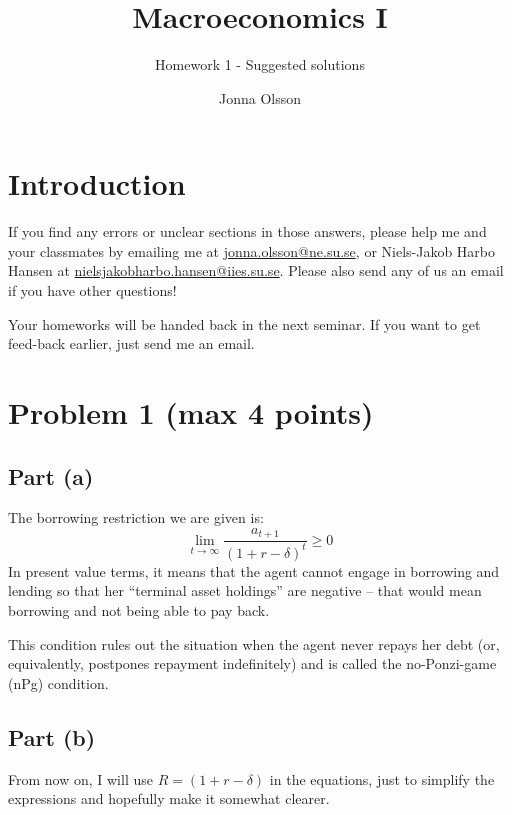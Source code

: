 \documentclass{scrartcl}
\begin{document}
\pagestyle{fancy}
\fancyhead{}
\fancyhead[LE,RO]{\thepage}
\fancyfoot{}

\title{Macroeconomics I}
\subtitle{Homework 1 - Suggested solutions}
\author{Jonna Olsson}
\maketitle

\section*{Introduction}
If you find any errors or unclear sections in those answers, please help me and your classmates by emailing me at \url{jonna.olsson@ne.su.se}, or Niels-Jakob Harbo Hansen at \url{nielsjakobharbo.hansen@iies.su.se}. Please also send any of us an email if you have other questions! 

Your homeworks will be handed back in the next seminar. If you want to get feed-back earlier, just send me an email. 


\section*{Problem 1 (max 4 points)}

\subsection*{Part (a)}
The borrowing restriction we are given is: 
\[
	\lim_{t \rightarrow \infty} \frac{a_{t+1}}{(1+r-\delta)^t} \geq 0
\]
In present value terms, it means that the agent cannot engage in borrowing and lending so that her ``terminal asset holdings'' are negative -- that would mean borrowing and not being able to pay back. 

This condition rules out the situation when the agent never repays her debt (or, equivalently, postpones repayment indefinitely) and is called the no-Ponzi-game (nPg) condition. 

\subsection*{Part (b)}
From now on, I will use $R=(1+r-\delta)$ in the equations, just to simplify the expressions and hopefully make it somewhat clearer. 
\end{document}
